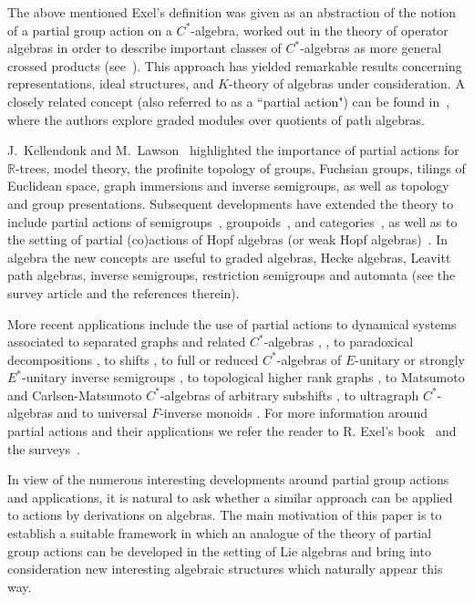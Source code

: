 \documentclass[10pt,a4paper]{amsart}
\theoremstyle{definition}
\theoremstyle{remark}
\numberwithin{equation}{section}
\newtheorem*{Theorem A}{\textbf{Theorem A}}
\newtheorem*{Corollary E}{\textbf{Corollary E}}
\newtheorem*{Corollary F}{\textbf{Corollary F}}
\newtheorem*{Theorem B}{\textbf{Theorem B}}
\newtheorem*{Theorem C}{\textbf{Theorem C}}
\newtheorem*{Theorem D}{\textbf{Theorem B}}
\newtheorem*{p a}{\textbf{Proof of  Theorem A}}
\newtheorem*{p b}{\textbf{Proof of Theorem B}}
\newtheorem*{p c}{\textbf{Proof of  Theorem C}}
\newtheorem*{p d}{\textbf{Proof of  Theorem D}}
\newcommand{\0}{{\vartheta}}
\begin{document}
The above mentioned  Exel's definition was given as an abstraction of the notion of a partial group action    on a $C^*$-algebra, worked out in the theory of operator algebras in order to  describe important classes of $C^*$-algebras as more general crossed products (see~\cite{exel1994,Mc,E0}). This approach has yielded remarkable results concerning  representations, ideal structures, and $K$-theory of algebras under consideration. A closely related concept (also referred to as a ``partial action") can be found in~\cite{GreenMarcos}, where the authors explore graded modules over quotients of path algebras. 

J.~Kellendonk and M.~Lawson~\cite{Lawson} highlighted the  importance of partial actions for $\mathbb{R}$-trees, model theory, the profinite topology of groups, Fuchsian groups, tilings of Euclidean space, graph immersions and inverse semigroups, as well as topology and group presentations.  Subsequent developments  have extended the theory  to include partial actions of semigroups~\cite{Megre2,Hol1,GouHol1,CornGould,Kud,
Khry1,KudLaan2}, groupoids~\cite{Gilbert,BP,CaenFier,NysOinPin,MaPi}, and categories~\cite{Nystedt}, as well as to the setting of partial   (co)actions of Hopf algebras (or weak Hopf algebras)~\cite{CaenJan,AB3,ABV,CasPaqQuaSant,
BatiVerc1,HuVerc,AzMaPaSi,BaHaSaVe}.
In algebra the new concepts are   useful   to graded algebras,   Hecke algebras,   Leavitt path algebras,  
  inverse semigroups,  restriction  semigroups  and automata (see the survey article \cite{dokuchaev2019} and the references therein). 
  
  More  recent applications include the use of partial actions    to dynamical systems associated to separated graphs and related $C^*$-algebras   \cite{AraE1}, \cite{AraL},  to paradoxical decompositions \cite{AraE1}, to shifts  \cite{AraL}, to full or reduced $C^*$-algebras  of $E$-unitary or strongly $E^*$-unitary inverse semigroups  \cite{MiSt}, 
to  topological higher rank graphs \cite{RenWil}, to Matsumoto and Carlsen-Matsumoto $C^*$-algebras of arbitrary subshifts    \cite{DE2},   to ultragraph $C^*$-algebras \cite{GR3} and to universal $F$-inverse monoids \cite{KudFur}.
 For more information around partial actions and their
applications we refer the reader to R. Exel’s book~\cite{ExelBook} and the surveys~\cite{Ba,dokuchaev2011,dokuchaev2019}.


In view of the numerous interesting developments around partial group actions and applications, it is natural to ask whether a similar approach can be applied to actions by derivations on algebras. The main motivation of this paper is to establish a suitable framework in which an analogue of the theory of partial group actions can be developed in the setting of Lie algebras  and bring into consideration new interesting algebraic structures which naturally appear this way. 
\end{document}

